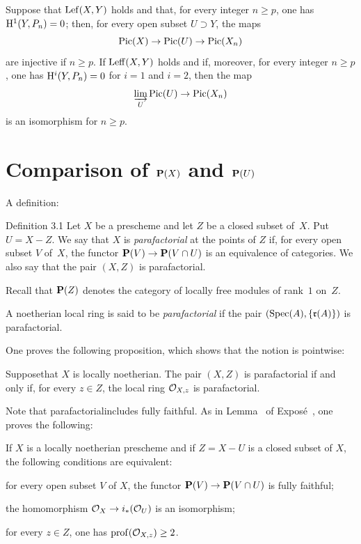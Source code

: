 \begin{corollaire} \label{XI.2.2} Suppose that $\operatorname{Lef}(X, Y)$ holds and that, for every integer $n\geq p$, one has $\mathrm H^1(Y, P_n)=0$; then, for every open subset $U\supset Y$, the maps
\[
\operatorname{Pic}(X)\to\operatorname{Pic}(U)\to\operatorname{Pic}(X_n)
\]
are injective if $n\geq p$. If $\operatorname{Leff}(X, Y)$ holds and if, moreover, for every integer $n\geq p$, one has $\mathrm H^i(Y, P_n)=0$ for $i=1$ and $i=2$, then the map
\[
\varinjlim_U\operatorname{Pic}(U)\to\operatorname{Pic}(X_n)
\]
is an isomorphism for $n\geq p$.
\end{corollaire}

\section{Comparison of $\mathbf P(X)$ and $\mathbf P(U)$} \label{XI.3}

A definition:
\label{XI.3.1}
\begin{enonce*}[remark]{Definition 3.1\sfootnotemark}
Let $X$ be a prescheme and let $Z$ be a closed subset of~$X$. Put $U=X-Z$. We say that $X$ is \emph{parafactorial} at the points of $Z$ if, for every open subset $V$ of~$X$, the functor $\mathbf P(V)\to \mathbf P(V\cap U)$ is an equivalence of categories. We also say that the pair $(X, Z)$ is parafactorial.
\end{enonce*}

Recall that $\mathbf P(Z)$ denotes the category of locally free modules of rank~$1$ on~$Z$.

\begin{definition} \label{XI.3.2}
A noetherian local ring is said to be \emph{parafactorial} if the pair $(\operatorname{Spec}(A), \{\mathfrak{r}(A)\})$ is parafactorial.
\end{definition}

One proves the following proposition, which shows that the notion is \og pointwise\fg:

\begin{proposition} \label{XI.3.3}
Suppose\pageoriginale that $X$ is locally noetherian. The pair $(X, Z)$ is parafactorial if and only if, for every $z\in Z$, the local ring $\mathcal O_{X, z}$ is parafactorial.
\end{proposition}

Note that \og parafactorial\fg includes \og fully faithful\fg. As in Lemma~ of Expos\'e~, one proves the following:

\begin{lemme} \label{XI.3.4}
If $X$ is a locally noetherian prescheme and if $Z=X-U$ is a closed subset of $X$, the following conditions are equivalent:
\begin{enumeratei}
\item
for every open subset $V$ of $X$, the functor $\mathbf P(V)\to \mathbf P(V\cap U)$ is fully faithful;
\item
the homomorphism $\mathcal O_X \to i_*(\mathcal O_U)$ is an isomorphism;
\item
for every $z\in Z$, one has $\operatorname{prof}(\mathcal O_{X, z})\geq 2$.
\end{enumeratei}
\end{lemme}


